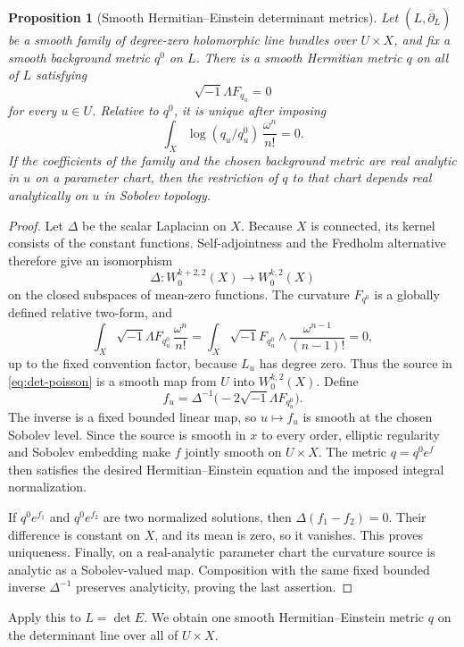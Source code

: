 \documentclass[11pt,reqno]{amsart}
\newtheorem{proposition}[theorem]{Proposition}
\theoremstyle{definition}
\theoremstyle{remark}
\newcommand{\ddbar}{\overline\partial}
\begin{document}
\begin{proposition}[Smooth Hermitian--Einstein determinant metrics]\label{prop:smooth-det}
Let $(L,\ddbar_L)$ be a smooth family of degree-zero holomorphic line bundles over $U\times X$, and fix a smooth background metric $q^0$ on $L$.  There is a smooth Hermitian metric $q$ on all of $L$ satisfying
\[
  \sqrt{-1}\Lambda F_{q_u}=0
\]
for every $u\in U$.  Relative to $q^0$, it is unique after imposing
\[
  \int_X\log(q_u/q^0_u)\,\frac{\omega^n}{n!}=0.
\]
If the coefficients of the family and the chosen background metric are real analytic in $u$ on a parameter chart, then the restriction of $q$ to that chart depends real analytically on $u$ in Sobolev topology.
\end{proposition}

\begin{proof}
Let $\Delta$ be the scalar Laplacian on $X$.  Because $X$ is connected,
its kernel consists of the constant functions.  Self-adjointness and the
Fredholm alternative therefore give an isomorphism
\[
  \Delta:W^{k+2,2}_0(X)\longrightarrow W^{k,2}_0(X)
\]
on the closed subspaces of mean-zero functions.  The curvature
$F_{q^0}$ is a globally defined relative two-form, and
\[
 \int_X\sqrt{-1}\Lambda F_{q^0_u}\,\frac{\omega^n}{n!}
 =\int_X\sqrt{-1}F_{q^0_u}\wedge
                  \frac{\omega^{n-1}}{(n-1)!}=0,
\]
up to the fixed convention factor, because $L_u$ has degree zero.
Thus the source in \eqref{eq:det-poisson} is a smooth map from $U$ into
$W^{k,2}_0(X)$.  Define
\[
  f_u=\Delta^{-1}\bigl(-2\sqrt{-1}\Lambda F_{q^0_u}\bigr).
\]
The inverse is a fixed bounded linear map, so $u\mapsto f_u$ is smooth
at the chosen Sobolev level.  Since the source is smooth in $x$ to every
order, elliptic regularity and Sobolev embedding make $f$ jointly smooth
on $U\times X$.  The metric $q=q^0e^f$ then satisfies the desired
Hermitian--Einstein equation and the imposed integral normalization.

If $q^0e^{f_1}$ and $q^0e^{f_2}$ are two normalized solutions, then
$\Delta(f_1-f_2)=0$.  Their difference is constant on $X$, and its
mean is zero, so it vanishes.  This proves uniqueness.  Finally, on a
real-analytic parameter chart the curvature source is analytic as a
Sobolev-valued map.  Composition with the same fixed bounded inverse
$\Delta^{-1}$ preserves analyticity, proving the last assertion.
\end{proof}

Apply this to $L=\det E$.  We obtain one smooth Hermitian--Einstein metric $q$ on the determinant line over all of $U\times X$.
\end{document}
